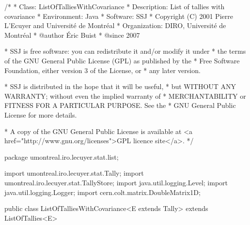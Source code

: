 \begin{code}
\begin{hide}
/*
 * Class:        ListOfTalliesWithCovariance
 * Description:  List of tallies with covariance
 * Environment:  Java
 * Software:     SSJ 
 * Copyright (C) 2001  Pierre L'Ecuyer and Université de Montréal
 * Organization: DIRO, Université de Montréal
 * @author       Éric Buist 
 * @since        2007

 * SSJ is free software: you can redistribute it and/or modify it under
 * the terms of the GNU General Public License (GPL) as published by the
 * Free Software Foundation, either version 3 of the License, or
 * any later version.

 * SSJ is distributed in the hope that it will be useful,
 * but WITHOUT ANY WARRANTY; without even the implied warranty of
 * MERCHANTABILITY or FITNESS FOR A PARTICULAR PURPOSE.  See the
 * GNU General Public License for more details.

 * A copy of the GNU General Public License is available at
   <a href="http://www.gnu.org/licenses">GPL licence site</a>.
 */
\end{hide}
package umontreal.iro.lecuyer.stat.list;\begin{hide}

import umontreal.iro.lecuyer.stat.Tally;
import umontreal.iro.lecuyer.stat.TallyStore;
import java.util.logging.Level;
import java.util.logging.Logger;
import cern.colt.matrix.DoubleMatrix1D;
\end{hide}


public class ListOfTalliesWithCovariance<E extends Tally>
       extends ListOfTallies<E>\begin{hide} {
   private double[] tempArray;
   private double[][] sxy;

   // Determines if we use a numerically stable covariance
   // formula.
   private boolean isStable = true;

   // The average of the first observations, for each tally
   private double[] curAverages;

   // The sum (xi - average)(yi - average) of the first observations
   private double[][] curSum2;
   private Logger log = Logger.getLogger ("umontreal.iro.lecuyer.stat.list");
\end{hide}
\end{code}
